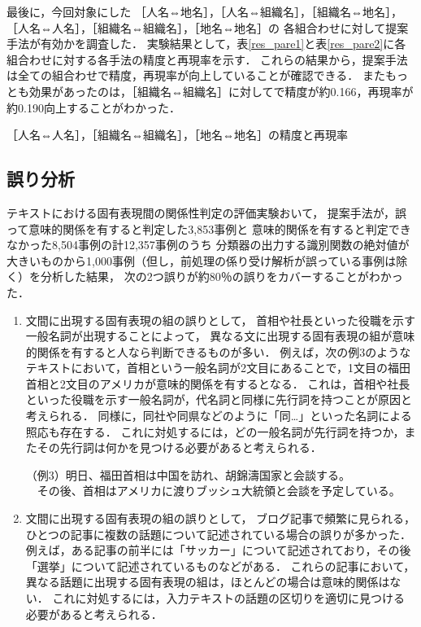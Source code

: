 \documentclass[japanese]{jnlp_1.4}
\begin{document}
最後に，今回対象にした
［人名⇔地名］，［人名⇔組織名］，［組織名⇔地名］，［人名⇔人名］，［組織名⇔組織名］，［地名⇔地名］の
各組合わせに対して提案手法が有効かを調査した．
実験結果として，表\ref{res_pare1}と表\ref{res_pare2}に各組合わせに対する各手法の精度と再現率を示す．
これらの結果から，提案手法は全ての組合わせで精度，再現率が向上していることが確認できる．
またもっとも効果があったのは，［組織名⇔組織名］に対してで精度が約0.166，再現率が約0.190向上することがわかった．

\begin{table}[t]
\caption{［人名⇔人名］，［組織名⇔組織名］，［地名⇔地名］の精度と再現率}
\label{res_pare2}

\end{table}



\subsection{誤り分析}
\label{ayamari}

テキストにおける固有表現間の関係性判定の評価実験おいて，
提案手法が，誤って意味的関係を有すると判定した3,853事例と
意味的関係を有すると判定できなかった8,504事例の計12,357事例のうち
分類器の出力する識別関数の絶対値が大きいものから1,000事例（但し，前処理の係り受け解析が誤っている事例は除く）を分析した結果，
次の2つ誤りが約80％の誤りをカバーすることがわかった．

\vspace{1\baselineskip}
\begin{enumerate}
\item 文間に出現する固有表現の組の誤りとして，
首相や社長といった役職を示す一般名詞が出現することによって，
異なる文に出現する固有表現の組が意味的関係を有すると人なら判断できるものが多い．
例えば，次の例3のようなテキストにおいて，首相という一般名詞が2文目にあることで，1文目の福田首相と2文目のアメリカが意味的関係を有するとなる．
これは，首相や社長といった役職を示す一般名詞が，代名詞と同様に先行詞を持つことが原因と考えられる．
同様に，同社や同県などのように「同…」といった名詞による照応も存在する．
これに対処するには，どの一般名詞が先行詞を持つか，またその先行詞は何かを見つける必要があると考えられる．

\vspace{1\baselineskip}
（例3）明日、福田首相は中国を訪れ、胡錦濤国家と会談する。\\
　\phantom{（例3）}その後、首相はアメリカに渡りブッシュ大統領と会談を予定している。
\vspace{1\baselineskip}

\item 文間に出現する固有表現の組の誤りとして，
ブログ記事で頻繁に見られる，ひとつの記事に複数の話題について記述されている場合の誤りが多かった．
例えば，ある記事の前半には「サッカー」について記述されており，その後「選挙」について記述されているものなどがある．
これらの記事において，異なる話題に出現する固有表現の組は，ほとんどの場合は意味的関係はない．
これに対処するには，入力テキストの話題の区切りを適切に見つける必要があると考えられる．
\end{enumerate}
\end{document}

